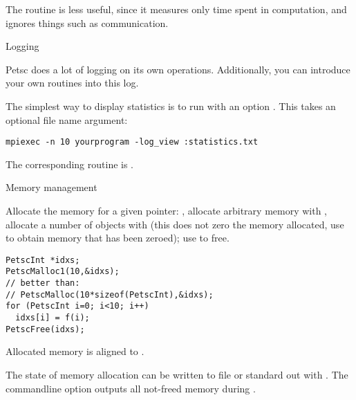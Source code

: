 The routine  is less useful, since it measures only
time spent in computation, and ignores things such as communication.

 {Logging}

Petsc does a lot of logging on its own operations.
Additionally, you can introduce your own routines into this log.

The simplest way to display statistics is to run
with an option .
This takes an optional file name argument:
\begin{verbatim}
mpiexec -n 10 yourprogram -log_view :statistics.txt
\end{verbatim}
The corresponding routine is .

 {Memory management}
\label{sec:petscmalloc}

Allocate the memory for a given pointer: ,
allocate arbitrary memory with ,
allocate a number of objects with 
(this does not zero the memory allocated,
 use  to obtain memory that has been zeroed);
use  to free.
\begin{lstlisting}
PetscInt *idxs;
PetscMalloc1(10,&idxs);
// better than:
// PetscMalloc(10*sizeof(PetscInt),&idxs);
for (PetscInt i=0; i<10; i++)
  idxs[i] = f(i);
PetscFree(idxs);
\end{lstlisting}
Allocated memory is aligned to .

The state of memory allocation can be written to file or standard out
with . The commandline option
 outputs all not-freed memory during
.
